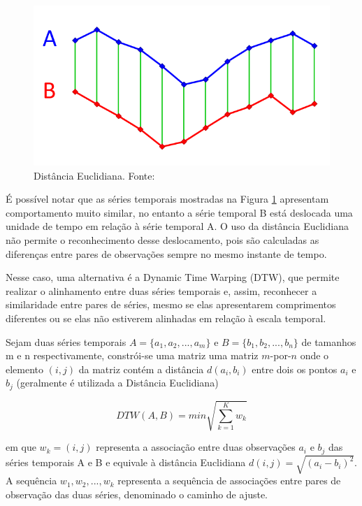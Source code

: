 \begin{figure}[H]
	\centering
	\includegraphics[scale=0.3]{pasta1_figuras/ED.png}
	\caption {Distância Euclidiana. Fonte: \cite{ferraz2016}}
	\label{fig-distED}
\end{figure}

É possível notar que as séries temporais mostradas na Figura \ref{fig-distED} apresentam comportamento muito similar, no entanto a série temporal B está deslocada uma unidade de tempo em relação à série temporal A. O uso da distância Euclidiana não permite o reconhecimento desse deslocamento, pois são calculadas as diferenças entre pares de observações sempre no mesmo instante de tempo.

Nesse caso, uma alternativa é a Dynamic Time Warping (DTW)\cite{Berndt:1994:UDT:3000850.3000887}, que permite realizar o alinhamento entre duas séries temporais e, assim, reconhecer a similaridade entre pares de séries, mesmo se elas apresentarem comprimentos diferentes ou se elas não estiverem alinhadas em relação à escala temporal. 

Sejam duas séries temporais $A = \{a_1,a_2,...,a_m \}$ e $B = \{b_1,b_2,...,b_n \}$  de tamanhos m e n respectivamente, constrói-se uma matriz uma matriz $m$-por-$n$ onde o elemento $(i,j)$ da matriz contém a distância $d(a_i,b_i)$ entre dois os pontos $a_i$ e $b_j$ (geralmente é utilizada a Distância Euclidiana)

\begin{equation}
DTW(A,B) = min\sqrt{\sum_{k=1}^{K}w_k}
\end{equation}

em que $w_k = (i,j)$ representa a associação entre duas observações $a_i$ e $b_j$ das séries temporais A e B e equivale à distância Euclidiana $d(i,j) = \sqrt{(a_i - b_i)^2}$. A sequência $w_1,w_2,...,w_k$ representa a sequência de associações entre pares de observação das duas séries, denominado o caminho de ajuste. 

